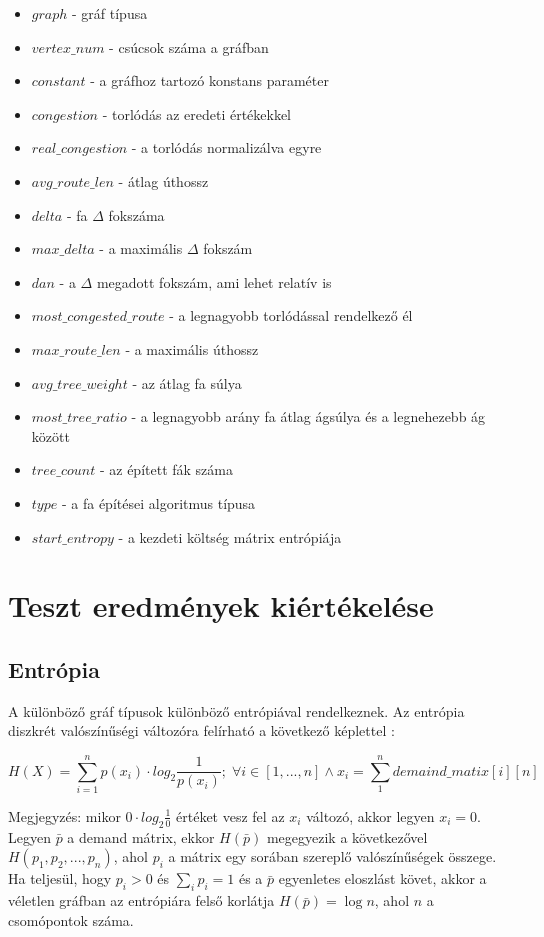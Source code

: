 \documentclass[12pt]{report}
\begin{document}
\begin{itemize}
	\item $graph$ - gráf típusa 
	\item $vertex\_num$ - csúcsok száma a gráfban
	\item $constant$ - a gráfhoz tartozó konstans paraméter 
	\item $congestion$ - torlódás az eredeti értékekkel
	\item $real\_congestion$ - a torlódás normalizálva egyre
	\item $avg\_route\_len$ - átlag úthossz
	\item $delta$ - fa $\Delta$ fokszáma
	\item $max\_delta$ - a maximális $\Delta$ fokszám
	\item $dan$ - a $\Delta$ megadott fokszám, ami lehet relatív is
	\item $most\_congested\_route$ - a legnagyobb torlódással rendelkező él
	\item $max\_route\_len$ - a maximális úthossz
	\item $avg\_tree\_weight$ - az átlag fa súlya
	\item $most\_tree\_ratio$ - a legnagyobb arány fa átlag ágsúlya és a legnehezebb ág között
	\item $tree\_count$ - az épített fák száma
	\item $type$ - a fa építései algoritmus típusa
	\item $start\_entropy$ - a kezdeti költség mátrix entrópiája
\end{itemize}
	

\chapter{Teszt eredmények kiértékelése}

\section{Entrópia}

A különböző gráf típusok különböző entrópiával rendelkeznek.
Az entrópia diszkrét valószínűségi változóra felírható a következő képlettel \cite{DBLP:journals/corr/AvinMS17}:  

\[H(X) = \sum_{i=1}^{n} p(x_i) \cdot log_2\frac{1}{p(x_i)}; \; \forall i\in[1, ..., n] \land x_i = \sum_{1}^{n} demaind\_matix[i][n]\] 

Megjegyzés: mikor \(0\cdot log_2\frac{1}{0}\) értéket vesz fel az \(x_i\) változó, akkor legyen \(x_i=0\). 
Legyen \(\bar{p}\) a demand mátrix, ekkor \(H(\bar{p})\) megegyezik a következővel \(H(p_1, p_2, ..., p_n)\), ahol \(p_i\) a mátrix egy sorában szereplő valószínűségek összege.
Ha teljesül, hogy \(p_i > 0\) és $\sum_{i}p_i = 1$ és a \(\bar{p}\) egyenletes eloszlást követ, akkor a véletlen gráfban az entrópiára felső korlátja \(H(\bar{p}) = \log n\), ahol $n$ a csomópontok száma.
\end{document}
